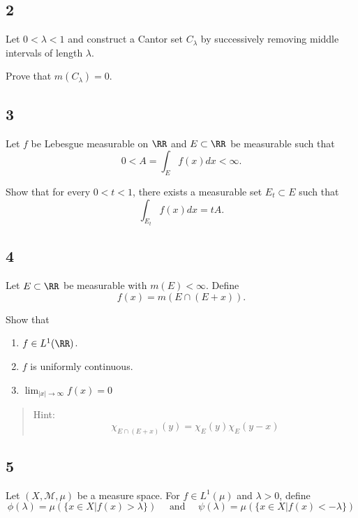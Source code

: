 \hypertarget{section-1}{%
\subsection{2}\label{section-1}}

Let \(0 < \lambda < 1\) and construct a Cantor set \(C_\lambda\) by
successively removing middle intervals of length \(\lambda\).

Prove that \(m(C_\lambda) = 0\).

\hypertarget{section-2}{%
\subsection{3}\label{section-2}}

Let \(f\) be Lebesgue measurable on \(\RR\) and \(E \subset \RR\) be
measurable such that \[
0<A=\int_{E} f(x) d x<\infty.
\]

Show that for every \(0 < t < 1\), there exists a measurable set
\(E_t \subset E\) such that \[
\int_{E_{t}} f(x) d x=t A.
\]

\hypertarget{section-3}{%
\subsection{4}\label{section-3}}

Let \(E \subset \RR\) be measurable with \(m(E) < \infty\). Define \[
f(x)=m(E \cap(E+x)).
\]

Show that

\begin{enumerate}
\def\labelenumi{\arabic{enumi}.}
\tightlist
\item
  \(f\in L^1(\RR)\).
\item
  \(f\) is uniformly continuous.
\item
  \(\lim _{|x| \rightarrow \infty} f(x)=0\)
\end{enumerate}

\begin{quote}
Hint: \[
\chi_{E \cap(E+x)}(y)=\chi_{E}(y) \chi_{E}(y-x)
\]
\end{quote}

\hypertarget{section-4}{%
\subsection{5}\label{section-4}}

Let \((X, \mathcal M, \mu)\) be a measure space. For \(f\in L^1(\mu)\)
and \(\lambda > 0\), define \[
\phi(\lambda)=\mu(\{x \in X | f(x)>\lambda\}) 
\quad \text { and } \quad 
\psi(\lambda)=\mu(\{x \in X | f(x)<-\lambda\})
\]

